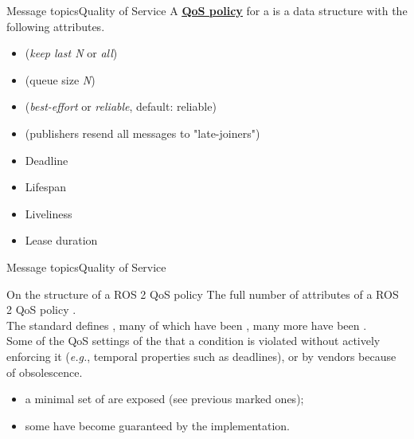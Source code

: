 \begin{frame}{Message topics}{Quality of Service}
	\justifying
	A \href{https://docs.ros.org/en/jazzy/Concepts/About-Quality-of-Service-Settings.html}{\color{blue}\textbf{\underline{QoS policy}}} for a  is a data structure with the following attributes.
	\begin{itemize}
		\item {} (\emph{keep last N} or \emph{all})
		\item {} (queue size \emph{N})
		\item {} (\emph{best-effort} or \emph{reliable}, default: reliable)
		\item {} (publishers resend all messages to "late-joiners")
		\item Deadline
		\item Lifespan
		\item Liveliness
		\item Lease duration
	\end{itemize}
\end{frame}
\begin{frame}{Message topics}{Quality of Service}
  \justifying
  \begin{alertblock}{On the structure of a ROS 2 QoS policy}
    \justifying
    The full number of attributes of a ROS 2 QoS policy .\\
    \medskip
    The  standard defines , many of which have been , many more have been .\\
    \medskip
    Some of the QoS settings of the   that a condition is violated without actively enforcing it (\emph{e.g.}, temporal properties such as deadlines), or  by vendors because of obsolescence.\\
    \medskip
  \end{alertblock}
  \begin{itemize}
    \item a minimal set of  are exposed (see previous marked ones);
    \item some have become  guaranteed by the implementation.
  \end{itemize}
\end{frame}
